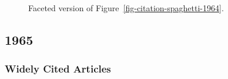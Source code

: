 \documentclass[
  10pt,
  letterpaper,
  DIV=11,
  numbers=noendperiod,
  twoside]{scrartcl}
\begin{document}
\begin{figure}


\caption{\label{fig-citation-facet-1964}Faceted version of
Figure~\ref{fig-citation-spaghetti-1964}.}

\end{figure}%

\newpage

\subsection{1965}\label{sec-s1965}

\subsubsection*{Widely Cited Articles}\label{widely-cited-articles-9}
\end{document}
